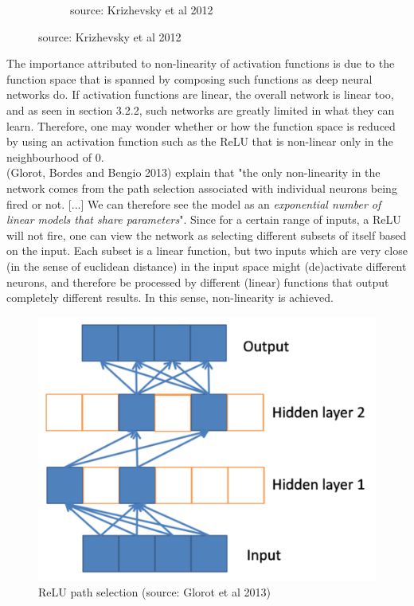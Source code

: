 \documentclass[a4paper,11pt]{article}
\begin{document}
\begin{figure}
\begin{minipage}[b]{\textwidth}
\begin{subfigure}{.5\textwidth}
        \caption{source: Krizhevsky et al 2012}\label{fig:2b}
      \end{subfigure} \par \vspace*{20pt} %
    \end{minipage}%
\end{figure}

The importance attributed to non-linearity of activation functions is due to the function space that is spanned by composing such functions as deep neural networks do. If activation functions are linear, the overall network is linear too, and as seen in section 3.2.2, such networks are greatly limited in what they can learn. Therefore, one may wonder whether or how the function space is reduced by using an activation function such as the ReLU that is non-linear only in the neighbourhood of $0$.  \\

(Glorot, Bordes and Bengio 2013) \cite{rectifier} explain that "the only non-linearity in the network comes from the path selection associated with individual neurons being fired or not. [...] We can therefore see the model as an \textit{exponential number of linear models that share parameters}". Since for a certain range of inputs, a ReLU will not fire, one can view the network as selecting different subsets of itself based on the input. Each subset is a linear function, but two inputs which are very close (in the sense of euclidean distance) in the input space might (de)activate different neurons, and therefore be processed by different (linear) functions that output completely different results. In this sense, non-linearity is achieved. \\

\begin{figure}[h!]
	\centering
	\includegraphics[scale=0.4]{images/ReLU_path_selection.png}
	\caption{ReLU path selection (source: Glorot et al 2013)}
\end{figure}
\end{document}

